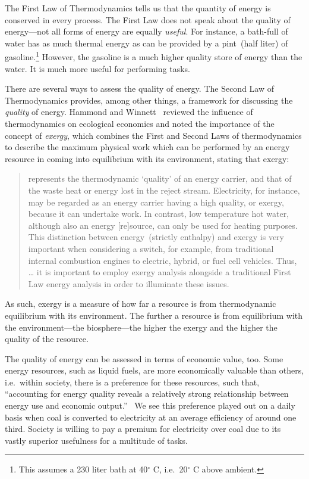 The First Law of Thermodynamics
tells us that
the quantity of energy is conserved in every process.
The First Law
does not speak about the quality of energy---not
all forms of energy are equally \emph{useful}.
For instance,
a bath-full of water has as much thermal energy
as can be provided by a pint~(half liter) of
gasoline.\footnote{This assumes a 230 liter bath at
40$^\circ$ C,
i.e.\ 20$^\circ$ C above ambient.}
However, the gasoline is a much higher quality
store of energy than the water.
It is much more useful for performing tasks.

There are several ways to assess the quality of energy.
The Second Law of Thermodynamics provides, 
among other things,
a framework for discussing the \emph{quality} of energy.
Hammond and Winnett~\cite{Hammond:2009tu} reviewed
the influence of thermodynamics on ecological economics 
and noted the importance of the concept of \emph{exergy},
which combines the First
and Second
Laws of thermodynamics
to describe the maximum physical work 
which can be performed by an energy resource
in coming into equilibrium with its environment,
stating that exergy:

\begin{quote}
	represents the thermodynamic `quality' 
	of an energy carrier, 
	and that of the waste heat or energy lost in the reject stream. 
	Electricity, for instance, 
	may be regarded as an energy carrier having a high quality, 
	or exergy, because it can undertake work. 
	In contrast, low temperature hot water, 
	although also an energy [re]source, 
	can only be used for heating purposes. 
	This distinction between energy~(strictly enthalpy) 
	and exergy is very important 
	when considering a switch, for example, 
	from traditional internal combustion engines 
	to electric, hybrid, or fuel cell vehicles. 
	Thus, \ldots{} it is important to employ exergy analysis 
	alongside a traditional First Law energy analysis 
	in order to illuminate these issues.
\end{quote}

As such, exergy is a measure of how far a resource
is from thermodynamic equilibrium with its environment.
The further a resource is from equilibrium with the 
environment---the biosphere---the
higher the exergy and the higher the quality of the resource.

The quality of energy can be assessed in terms of economic value, too.
Some energy resources, such as liquid fuels, 
are more economically valuable than others,
i.e.\ within society, there is a preference for these resources,
such that, ``accounting for energy quality reveals a relatively strong relationship 
between energy use and economic output.''~\cite[p. 313]{Cleveland2000}
We see this preference played out on a daily basis
when coal is converted to electricity at 
an average efficiency of around one third.
Society is willing to pay a premium for electricity
over coal due to its vastly superior usefulness 
for a multitude of tasks.

